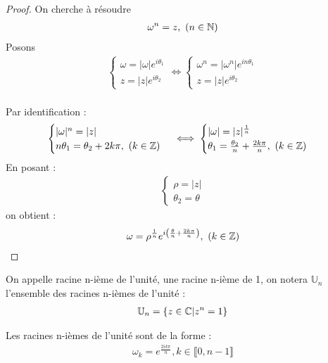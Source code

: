 \begin{proof}
On cherche à résoudre
\begin{align*}
\omega^n = z, \ (n \in \mathbb{N})
\end{align*}
Posons
\begin{align*}
\begin{cases}
\omega = |\omega|e^{i \theta_1} \\
z = |z| e^{i \theta_2}
\end{cases} 
\iff 
\begin{cases}
\omega^n = |\omega^n|e^{i n \theta_1} \\
z = |z| e^{i \theta_2}
\end{cases}
\end{align*}
\\
Par identification :
\begin{align*}
\begin{cases}
|\omega|^n = |z| \\
n \theta_1 = \theta_2 + 2k \pi,\ (k \in \mathbb{Z})
\end{cases}
\iff 
\begin{cases}
|\omega| = |z|^{\frac{1}{n}} \\
\theta_1 = \frac{\theta_2}{n} + \frac{2 k \pi}{n},\ (k \in \mathbb{Z})
\end{cases}
\end{align*}
En posant :
\begin{align*}
\begin{cases}
\rho = |z| \\
\theta_2 = \theta
\end{cases}
\end{align*}
on obtient :
\begin{align*}
\omega = \rho^{\frac{1}{n}} e^{i \left( \frac{\theta}{n} + \frac{2k\pi}{n} \right)},\ (k \in \mathbb{Z})
\end{align*}
\end{proof}

\begin{graybox}
\begin{definition}
    On appelle racine n-ième de l'unité, une racine n-ième de 1, on notera $\mathbb{U}_n$ l'ensemble des racines n-ièmes de l'unité :
    \begin{align*}
        \mathbb{U}_n = \{z \in \mathbb{C} | z^n = 1 \} 
    \end{align*}
\end{definition}
\end{graybox}

\begin{graybox}
\begin{proposition}
Les racines n-ièmes de l'unité sont de la forme :
    \begin{align*}
        \omega_k = e^{\frac{2ik\pi}{n}}, k \in \llbracket 0, n - 1 \rrbracket 
    \end{align*}
\end{proposition}
\end{graybox}

